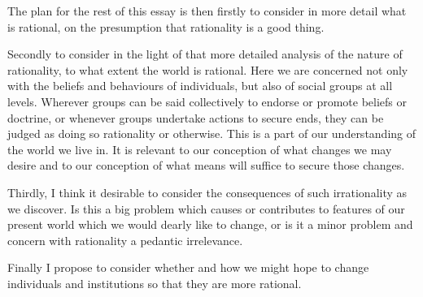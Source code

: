 The plan for the rest of this essay is then firstly to consider in more detail what is rational, on the presumption that rationality is a good thing.

Secondly to consider in the light of that more detailed analysis of the nature of rationality, to what extent the world is rational.
Here we are concerned not only with the beliefs and behaviours of individuals, but also of social groups at all levels.
Wherever groups can be said collectively to endorse or promote beliefs or doctrine, or whenever groups undertake actions to secure ends, they can be judged as doing so rationality or otherwise.
This is a part of our understanding of the world we live in.
It is relevant to our conception of what changes we may desire and to our conception of what means will suffice to secure those changes.

Thirdly, I think it desirable to consider the consequences of such irrationality as we discover.
Is this a big problem which causes or contributes to features of our present world which we would dearly like to change, or is it a minor problem and concern with rationality a pedantic irrelevance.

Finally I propose to consider whether and how we might hope to change individuals and institutions so that they are more rational.
